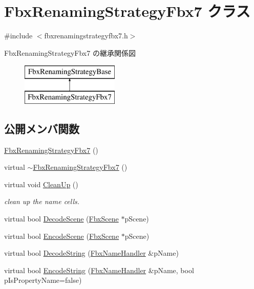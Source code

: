 \hypertarget{class_fbx_renaming_strategy_fbx7}{}\section{Fbx\+Renaming\+Strategy\+Fbx7 クラス}
\label{class_fbx_renaming_strategy_fbx7}


{\ttfamily \#include $<$fbxrenamingstrategyfbx7.\+h$>$}

Fbx\+Renaming\+Strategy\+Fbx7 の継承関係図\begin{figure}[H]
\begin{center}
\leavevmode
\includegraphics[height=2.000000cm]{class_fbx_renaming_strategy_fbx7}
\end{center}
\end{figure}
\subsection*{公開メンバ関数}
\begin{DoxyCompactItemize}
\item 
\hyperlink{class_fbx_renaming_strategy_fbx7_aef27c04b8c4d38bcc8e969e512464cd3}{Fbx\+Renaming\+Strategy\+Fbx7} ()
\item 
virtual \hyperlink{class_fbx_renaming_strategy_fbx7_aa069f7a937b771bae4657132f8a5006b}{$\sim$\+Fbx\+Renaming\+Strategy\+Fbx7} ()
\item 
virtual void \hyperlink{class_fbx_renaming_strategy_fbx7_a4495cc04e089d7e0d432e50a3161ea50}{Clean\+Up} ()
\begin{DoxyCompactList}\small\item\em clean up the name cells. \end{DoxyCompactList}\item 
virtual bool \hyperlink{class_fbx_renaming_strategy_fbx7_a203a4659e427f4c6046eff93031a24bf}{Decode\+Scene} (\hyperlink{class_fbx_scene}{Fbx\+Scene} $\ast$p\+Scene)
\item 
virtual bool \hyperlink{class_fbx_renaming_strategy_fbx7_a9c3d4574319c2e744a80d66f6c7c0ae3}{Encode\+Scene} (\hyperlink{class_fbx_scene}{Fbx\+Scene} $\ast$p\+Scene)
\item 
virtual bool \hyperlink{class_fbx_renaming_strategy_fbx7_a9f8f8714746bdc9904c31741e0b595f6}{Decode\+String} (\hyperlink{class_fbx_name_handler}{Fbx\+Name\+Handler} \&p\+Name)
\item 
virtual bool \hyperlink{class_fbx_renaming_strategy_fbx7_ae7ce3bfd32c1cb7c8ac420972287760e}{Encode\+String} (\hyperlink{class_fbx_name_handler}{Fbx\+Name\+Handler} \&p\+Name, bool p\+Is\+Property\+Name=false)
\end{DoxyCompactItemize}
